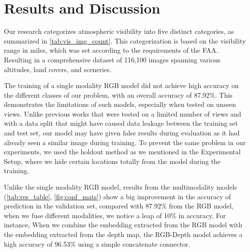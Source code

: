 \section{Results and Discussion}

Our research categorizes atmospheric visibility into five distinct categories, as summarized in \cref{tab:vis_img_count}. This categorization is based on the visibility range in miles, which was set according to the requirements of the FAA. Resulting in a comprehensive dataset of 116,100 images spanning various altitudes, land covers, and sceneries.

The training of a single modality RGB model did not achieve high accuracy on the different classes of our problem, with an overall accuracy of 87.92\%. This demonstrates the limitations of such models, especially when tested on unseen views. Unlike previous works that were tested on a limited number of views and with a data split that might have caused data leakage between the training set and test set, our model may have given false results during evaluation as it had already seen a similar image during training. To prevent the same problem in our experiments, we used the holdout method as we mentioned in the Experimental Setup,  %
where we hide certain locations totally from the model during the training.






Unlike the single modality RGB model, results from the multimodality models (\cref{tab:res_table}, \cref{fig:conf_mats})  show a big improvement in the accuracy of prediction in the validation set, compared with 87.92\% from the RGB model, when we fuse different modalities, we notice a leap of 10\% in accuracy. For instance, When we combine the embedding extracted from the RGB model with the embedding extracted from the depth map, the RGB-Depth model achieves a high accuracy of 96.53\% using a simple concatenate connector.


